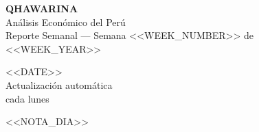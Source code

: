 \documentclass[10pt,a4paper]{article}
\begin{document}
\thispagestyle{empty}

\begin{tcolorbox}[
  enhanced,
  colback=terra,
  colframe=terra,
  boxrule=0pt,
  arc=0pt,
  left=10pt, right=10pt, top=10pt, bottom=10pt,
  width=\textwidth,
]
  \begin{minipage}[c]{0.6\textwidth}
    {\fontsize{22}{24}\selectfont\bfseries\color{white}QHAWARINA}\\[3pt]
    {\normalsize\color{white!80!terra}Análisis Económico del Perú}\\[2pt]
    {\small\color{white!70!terra}Reporte Semanal — Semana <<WEEK_NUMBER>> de <<WEEK_YEAR>>}
  \end{minipage}%
  \begin{minipage}[c]{0.39\textwidth}
    \raggedleft
    {\large\color{white}<<DATE>>}\\[4pt]
    {\small\color{white!70!terra}Actualización automática\\cada lunes}
  \end{minipage}
\end{tcolorbox}

\vspace{1em}

\begin{notabox}
  \small\color{ink}<<NOTA_DIA>>
\end{notabox}

\vspace{0.8em}
\end{document}
